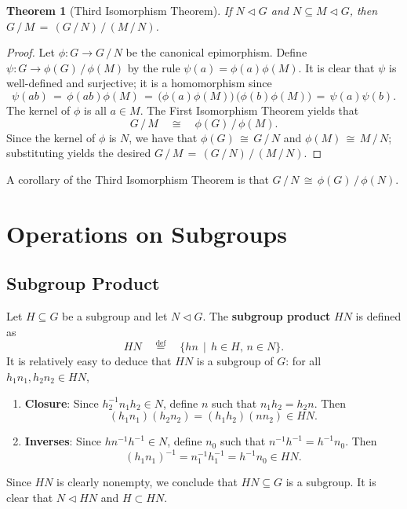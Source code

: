 \documentclass[11pt]{article}
\newtheorem{theorem}{Theorem}
\newcommand{\nsg}{\mathrel{\lhd}}
\begin{document}
\newpage

\begin{adjustwidth}{0.5cm}{}
  \begin{theorem}[Third Isomorphism Theorem]
    If $N \nsg G$ and $N \subseteq M \nsg G$, then $G \, / \, M \, = \, (G \, / \, N) \, / \, (M \, / \, N)$.
  \end{theorem}
  \begin{proof}
    Let $\phi : G \to G \, / \, N$ be the canonical epimorphism. Define $\psi : G \to \phi(G) \, / \, \phi(M)$ by the rule $\psi(a) = \phi(a)\phi(M)$. It is clear that $\psi$ is well-defined and surjective; it is a homomorphism since
    \[
      \psi(ab) \, = \, \phi(ab) \phi(M) \, = \, \big(\phi(a) \phi(M)\big) \, \big(\phi(b) \phi(M) \big) \, = \, \psi(a) \psi(b).
    \]
    The kernel of $\phi$ is all $a \in M$. The First Isomorphism Theorem yields that
    \[
      G \, / \, M \quad \cong \quad \phi(G) \, / \, \phi(M).
    \]
    Since the kernel of $\phi$ is $N$, we have that $\phi(G) \, \cong \, G \, / \, N$ and $\phi(M) \, \cong \, M \, / \, N$; substituting yields the desired $G \, / \, M \, = \, (G \, / \, N) \, / \, (M \, / \, N)$.
  \end{proof}
\end{adjustwidth}

A corollary of the Third Isomorphism Theorem is that $G \, / \, N \, \cong \, \phi(G) \, / \, \phi(N)$.


\section{Operations on Subgroups}


\subsection{Subgroup Product}

Let $H \subseteq G$ be a subgroup and let $N \nsg G$. The \textbf{subgroup product} $HN$ is defined as
\[
  HN \quad \stackrel{\text{def}}{=} \quad \{ hn \, \mid \, h \in H, \, n \in N \}.
\]
It is relatively easy to deduce that $HN$ is a subgroup of $G$: for all $h_{1}n_{1}, h_{2}n_{2} \in HN$,
\begin{enumerate}
  \item \textbf{Closure}: Since $h_{2}^{-1}n_{1}h_{2} \in N$, define $n$ such that $n_{1}h_{2} = h_{2}n$. Then
  \[
    (h_{1}n_{1})(h_{2}n_{2}) = (h_{1}h_{2})(nn_{2}) \in HN.
  \]
  \item \textbf{Inverses}: Since $hn^{-1}h^{-1} \in N$, define $n_{0}$ such that $n^{-1}h^{-1} = h^{-1}n_{0}$. Then
  \[
    (h_{1}n_{1})^{-1} = n_{1}^{-1}h_{1}^{-1} = h^{-1}n_{0} \in HN.
  \]
\end{enumerate}
Since $HN$ is clearly nonempty, we conclude that $HN \subseteq G$ is a subgroup. It is clear that $N \nsg HN$ and $H \subset HN$.

\end{document}
